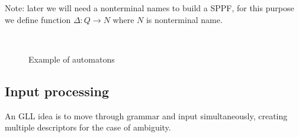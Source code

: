 \documentclass[runningheads,a4paper]{llncs}
\begin{document}
Note: later we will need a nonterminal names to build a SPPF, for this purpose we define function $\Delta : Q \to N$ where $N$
is nonterminal name.

\begin{figure}
    \centering
    ~
    ~
    \caption{Example of automatons}
    \label{fig:fig1}
\end{figure}



\subsection{Input processing}%
An GLL idea is to move through grammar and input simultaneously,
creating multiple descriptors for the case of ambiguity.
\end{document}

